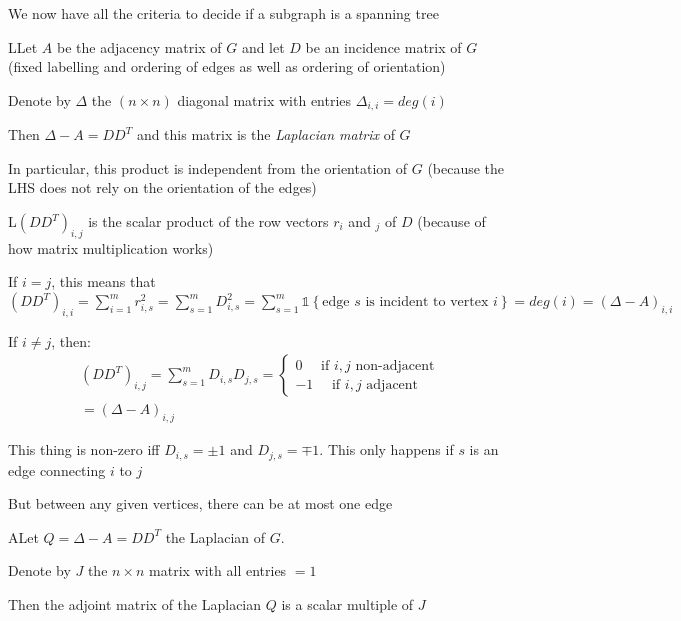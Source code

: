 \noindent We now have all the criteria to decide if a subgraph is a spanning tree
\par\bigskip
\begin{lem}
  LLet $A$ be the adjacency matrix of $G$ and let $D$ be an incidence matrix of $G$ (fixed labelling and ordering of edges as well as ordering of orientation)
  \par\bigskip
  \noindent Denote by $\Delta$ the $(n\times n)$ diagonal matrix with entries $\Delta_{i,i} = deg(i)$
  \par\bigskip
  \noindent Then $\Delta -A = DD^T$ and this matrix is the \textit{Laplacian matrix} of $G$
  \par\bigskip
  \noindent In particular, this product is independent from the orientation of $G$ (because the LHS does not rely on the orientation of the edges)
\end{lem}
\par\bigskip
\begin{prf}
  L$(DD^T)_{i,j}$ is the scalar product of the row vectors $r_i$ and $_j$ of $D$ (because of how matrix multiplication works)
  \par\bigskip
  \noindent If $i=j$, this means that $(DD^T)_{i,i} = \sum_{i=1}^{m}r_{i,s}^2 = \sum_{s=1}^{m}D_{i,s}^2 = \sum_{s=1}^{m}\mathbb{1}\left\{\text{edge $s$ is incident to vertex $i$}\right\} = deg(i) = (\Delta-A)_{i,i}$
  \par\bigskip
  \noindent If $i\neq j$, then:
  \begin{equation*}
    \begin{gathered}
      (DD^T)_{i,j} = \sum_{s=1}^{m}D_{i,s}D_{j,s} = \begin{cases}0\quad\text{ if $i,j$ non-adjacent}\\-1\quad\text{ if $i,j$ adjacent}\end{cases}\\
       = (\Delta-A)_{i,j}
    \end{gathered}
  \end{equation*}
  \par\bigskip
  \noindent This thing is non-zero iff $D_{i,s} = \pm 1$ and $D_{j,s} = \mp 1$. This only happens if $s$ is an edge connecting $i$ to $j$\par
  \noindent But between any given vertices, there can be at most one edge
\end{prf}
\par\bigskip
\begin{lem}
  ALet $Q = \Delta -A = DD^T$ the Laplacian of $G$.\par
  \noindent Denote by $J$ the $n\times n$ matrix with all entries $=1$
  \par\bigskip
  \noindent Then the adjoint matrix of the Laplacian $Q$ is a scalar multiple of $J$ 
\end{lem}
